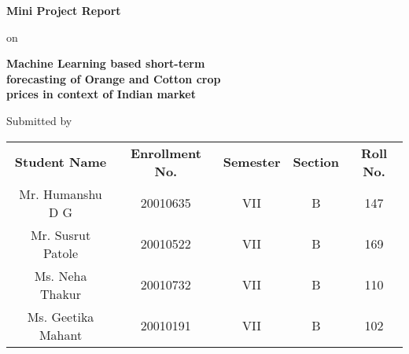 
\newcommand\reporttitle{\textbf{Mini Project Report}}
\newcommand\group{\textbf{Group - B1}}


\newcommand\reportsubtitle{
    \textbf{Machine Learning based short-term\\ forecasting of Orange and Cotton crop\\ prices in context of Indian market\\}
}

\begin{titlepage}
    
    \addmargin
    \centering



{\Large \reporttitle}

\vspace{1 em}
on
\vspace{1 em}

{\LARGE \reportsubtitle}

\vspace{4 em}

\begin{table}[H]
    \centering
        Submitted by\\
    \large
        \vspace{1 em}
    \begin{tabu} to \linewidth {C C C C C}
        \textbf{Student Name} & \textbf{Enrollment No.} & \textbf{Semester} & \textbf{Section} & \textbf{Roll No.}\\
        Mr. Humanshu D G & 20010635 & VII & B & 147\\
        Mr. Susrut Patole & 20010522 & VII & B & 169\\
        Ms. Neha Thakur & 20010732 & VII & B & 110\\
        Ms. Geetika Mahant & 20010191 & VII & B & 102
    \end{tabu}
\end{table}

\vspace{4 em}


\end{titlepage}
